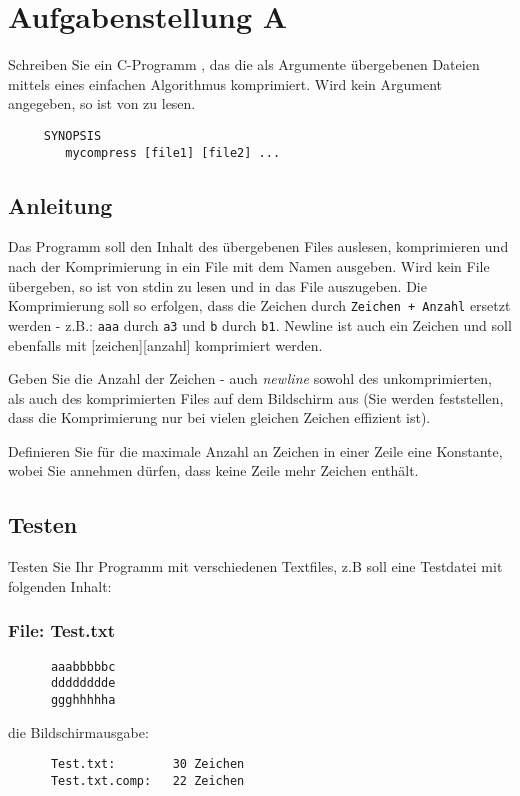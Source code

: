 




\section*{Aufgabenstellung A}
      Schreiben Sie ein C-Programm ,
      das die als Argumente übergebenen Dateien mittels
      eines einfachen Algorithmus komprimiert.
      Wird kein Argument angegeben, so ist von
       zu lesen.
\begin{verbatim}
	 SYNOPSIS
        mycompress [file1] [file2] ...
\end{verbatim}

\subsection*{Anleitung}
      Das Programm soll den Inhalt des übergebenen Files
      auslesen, komprimieren und nach der Komprimierung in ein
      File mit dem Namen 
      ausgeben. Wird kein File übergeben, so ist von stdin zu
      lesen und in das File  auszugeben. Die
      Komprimierung soll so erfolgen, dass die Zeichen durch
      \verb|Zeichen + Anzahl| ersetzt werden - z.B.: \verb|aaa| durch \verb|a3|
      und \verb|b| durch \verb|b1|. 
	Newline ist auch ein Zeichen und soll ebenfalls mit [zeichen][anzahl] komprimiert werden.
      
      Geben Sie die Anzahl der Zeichen - auch \emph{newline}
      sowohl des unkomprimierten, als auch des komprimierten Files
      auf dem Bildschirm aus (Sie werden feststellen, dass die
      Komprimierung nur bei vielen gleichen Zeichen effizient ist).

 	
      
      Definieren Sie für die maximale Anzahl an Zeichen in einer
      Zeile eine Konstante, wobei Sie annehmen dürfen, dass keine
      Zeile mehr Zeichen enthält.

      
\subsection*{Testen}
      Testen Sie Ihr Programm mit verschiedenen Textfiles, z.B
      soll eine Testdatei  mit folgenden Inhalt:
\subsubsection*{File: Test.txt}
\begin{verbatim}
      aaabbbbbc
      dddddddde
      ggghhhhha
\end{verbatim}
die Bildschirmausgabe:
\begin{verbatim}
      Test.txt:        30 Zeichen
      Test.txt.comp:   22 Zeichen
\end{verbatim}

